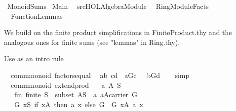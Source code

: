 %
\begin{isabellebody}%
\def\isabellecontext{MonoidSums}%
%
\isamarkuptrue%
%
\isadelimtheory
%
\endisadelimtheory
%
\isatagtheory
{}\isamarkupfalse%
\ MonoidSums\isanewline
\isanewline
{}\ Main\isanewline
\ \ {\isachardoublequoteopen}{\isachartilde}{\isachartilde}{\isacharslash}src{\isacharslash}HOL{\isacharslash}Algebra{\isacharslash}Module{\isachardoublequoteclose}\isanewline
\ \ RingModuleFacts\isanewline
\ \ FunctionLemmas\isanewline
{}%
\endisatagtheory
{\isafoldtheory}%
%
\isadelimtheory
%
\endisadelimtheory
%
\begin{isamarkuptext}%
We build on the finite product simplifications in FiniteProduct.thy and the analogous ones
for finite sums (see "lemmas" in Ring.thy).%
\end{isamarkuptext}%
\isamarkuptrue%
%
\begin{isamarkuptext}%
Use as an intro rule%
\end{isamarkuptext}%
\isamarkuptrue%
\isamarkupfalse%
\ {\isacharparenleft}\ comm{\isacharunderscore}monoid{\isacharparenright}\ factors{\isacharunderscore}equal{\isacharcolon}\isanewline
\ \ {\isachardoublequoteopen}{\isasymlbrakk}a{\isacharequal}b{\isacharsemicolon}\ c{\isacharequal}d{\isasymrbrakk}\ {\isasymLongrightarrow}\ a{\isasymotimes}\isactrlbsub G\isactrlesub c\ {\isacharequal}\ \ b{\isasymotimes}\isactrlbsub G\isactrlesub d{\isachardoublequoteclose}\isanewline
%
\isadelimproof
\ \ %
\endisadelimproof
%
\isatagproof
{}\isamarkupfalse%
\ simp%
\endisatagproof
{\isafoldproof}%
%
\isadelimproof
\isanewline
%
\endisadelimproof
\isanewline
\isanewline
{}\isamarkupfalse%
\ {\isacharparenleft}\ comm{\isacharunderscore}monoid{\isacharparenright}\ extend{\isacharunderscore}prod{\isacharcolon}\isanewline
\ \ \ a\ A\ S\isanewline
\ \ \ fin{\isacharcolon}\ {\isachardoublequoteopen}finite\ S{\isachardoublequoteclose}\ \ subset{\isacharcolon}\ {\isachardoublequoteopen}A{\isasymsubseteq}S{\isachardoublequoteclose}\ \ a{\isacharcolon}\ {\isachardoublequoteopen}a{\isasymin}A{\isasymrightarrow}carrier\ G{\isachardoublequoteclose}\isanewline
\ \ \ {\isachardoublequoteopen}{\isacharparenleft}{\isasymOtimes}\isactrlbsub G\isactrlesub \ x{\isasymin}S{\isachardot}\ {\isacharparenleft}if\ x{\isasymin}A\ then\ a\ x\ else\ {\isasymone}\isactrlbsub G\isactrlesub {\isacharparenright}{\isacharparenright}\ {\isacharequal}\ {\isacharparenleft}{\isasymOtimes}\isactrlbsub G\isactrlesub \ x{\isasymin}A{\isachardot}\ a\ x{\isacharparenright}{\isachardoublequoteclose}\isanewline

\end{isabellebody}

